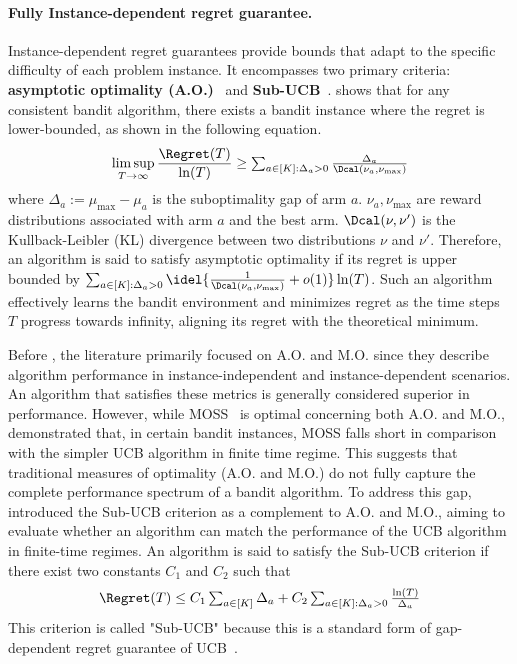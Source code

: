\paragraph{Fully Instance-dependent regret guarantee.} Instance-dependent regret guarantees provide bounds that adapt to the specific difficulty of each problem instance.
It encompasses two primary criteria: \textbf{asymptotic optimality (A.O.)}~\citep{lai85asymptotically} and \textbf{Sub-UCB}~\citep{lattimore18refining}. 
\citet{lai85asymptotically} shows that for any consistent bandit algorithm, there exists a bandit instance where the regret is lower-bounded, as shown in the following equation.
    \begin{align*}
        \limsup_{T\to\infty} \frac{\Regret(T)}{\ln(T)} \geq \textstyle\sum_{a\in[K]:\Delta_a > 0} \frac{\Delta_a}{\Dcal(\nu_a, \nu_{\max})}
    \end{align*}
    where $\Delta_a := \mu_{\max} - \mu_a$ is the suboptimality gap of arm $a$. $\nu_a, \nu_{\max}$ are reward distributions associated with arm $a$ and the best arm.
    $\Dcal(\nu, \nu')$ is the Kullback-Leibler (KL) divergence between two distributions $\nu$ and $\nu'$.
    Therefore, an algorithm is said to satisfy asymptotic optimality if its regret is upper bounded by $ \sum_{a\in[K]: \Delta_a > 0} \idel{\frac{1}{\Dcal(\nu_a, \nu_{\max})}+o(1)} \ln(T)$.
    Such an algorithm effectively learns the bandit environment and minimizes regret as the time steps $T$ progress towards infinity, aligning its regret with the theoretical minimum.

    Before \citet{lattimore18refining}, the literature primarily focused on A.O. and M.O. since they describe algorithm performance in instance-independent and instance-dependent scenarios.
    An algorithm that satisfies these metrics is generally considered superior in performance.
    However, while MOSS~\citep{audibert2009minimax} is optimal concerning both A.O. and M.O., \citet{lattimore2018refining} demonstrated that, in certain bandit instances, MOSS falls short in comparison with the simpler UCB algorithm in finite time regime. This suggests that traditional measures of optimality (A.O. and M.O.) do not fully capture the complete performance spectrum of a bandit algorithm.
    To address this gap, \citet{lattimore2018refining} introduced the Sub-UCB criterion as a complement to A.O. and M.O., aiming to evaluate whether an algorithm can match the performance of the UCB algorithm in finite-time regimes.
    An algorithm is said to satisfy the Sub-UCB criterion if there exist two constants $C_1$ and $C_2$ such that
    \begin{align*}
        \Regret(T) \leq C_1 \textstyle\sum_{a\in[K]} \Delta_a + C_2  \textstyle\sum_{a\in[K]:\Delta_a > 0} \frac{\ln(T)}{\Delta_a}
    \end{align*}
    This criterion is called "Sub-UCB" because this is a standard form of gap-dependent regret guarantee of UCB~\citep{auer02finite,lattimore18refining}.

